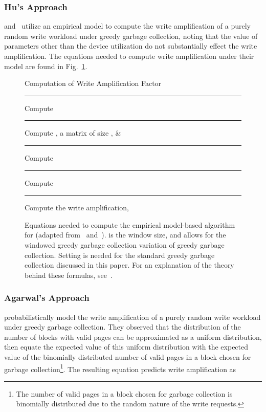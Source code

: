 \documentclass[prodmode,acmtos]{acmsmall}
\begin{document}
\subsubsection{Hu's Approach}
 and~ utilize an empirical model to compute the write amplification of a purely random write workload under greedy garbage collection, noting that the value of parameters other than the device utilization do not substantially effect the write amplification.  The equations needed to compute write amplification under their model are found in Fig.~\ref{eqn:fig_Hu}.

\begin{figure}[t!]
\begin{framed}
Computation of Write Amplification Factor
\medskip
\hrule \vspace{8pt}
Compute 

\hrule \vspace{8pt}
Compute , a matrix of size , \newline \phantom{1} \hspace{10.2mm} \quad \& \ \  

\hrule \vspace{8pt}
Compute 

\hrule \vspace{8pt}
Compute 

\hrule \vspace{8pt}
Compute the write amplification,

\end{framed}
\caption{Equations needed to compute the empirical model-based algorithm for  (adapted from~\cite{Hu2009,hu2010fundamental} and~\cite{frankie2012_ciit}).   is the window size, and allows for the windowed greedy garbage collection variation of greedy garbage collection.  Setting  is needed for the standard greedy garbage collection discussed in this paper.  For an explanation of the theory behind these formulas, see~\cite{Hu2009,hu2010fundamental}.}
\label{eqn:fig_Hu}
\end{figure}

\subsubsection{Agarwal's Approach}
 probabilistically model the write amplification of a purely random write workload under greedy garbage collection.  They observed that the distribution of the number of blocks with  valid pages can be approximated as a uniform distribution, then equate the expected value of this uniform distribution with the expected value of the binomially distributed number of valid pages in a block chosen for garbage collection\footnote{The number of valid pages in a block chosen for garbage collection is binomially distributed due to the random nature of the write requests.}.  The resulting equation predicts write amplification as
\end{document}

